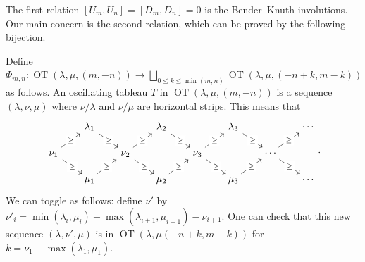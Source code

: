 \documentclass[12pt,a4paper]{article}
\theoremstyle{plain}
\theoremstyle{definition}
\theoremstyle{remark}
\newcommand{\OT}{\operatorname{OT}}
\begin{document}
    The first relation $[U_m,U_n] = [D_m,D_n] = 0$ is the Bender--Knuth involutions. Our main concern is the second relation, which can be proved by the following bijection.

    Define $\Phi_{m,n}:\OT(\lambda,\mu, (m,-n)) \longrightarrow \bigsqcup_{0\leq k \leq \min(m,n)}\OT(\lambda,\mu, (-n+k, m-k))$ as follows. An oscillating tableau $T$ in $\OT(\lambda,\mu, (m,-n))$ is a sequence $(\lambda,\nu,\mu)$ where $\nu/\lambda$ and $\nu/\mu$ are horizontal strips. This means that
    \[\begin{tikzcd}[sep = scriptsize]
    	& {\lambda_1} && {\lambda_2} && {\lambda_3} && \cdots \\
    	{\nu_1} && {\nu_2} && {\nu_3} && \cdots \\
    	& {\mu_1} && {\mu_2} && {\mu_3} && \cdots
    	\arrow["\geq"{description}, from=1-2, to=2-3]
        \arrow["\geq"{description}, from=1-4, to=2-5]
        \arrow["\geq"{description}, from=1-6, to=2-7]
        \arrow["\geq"{description}, from=2-1, to=1-2]
        \arrow["\geq"{description}, from=2-1, to=3-2]
        \arrow["\geq"{description}, from=2-3, to=1-4]
        \arrow["\geq"{description}, from=2-3, to=3-4]
        \arrow["\geq"{description}, from=2-5, to=1-6]
        \arrow["\geq"{description}, from=2-5, to=3-6]
        \arrow["\geq"{description}, from=2-7, to=1-8]
        \arrow["\geq"{description}, from=2-7, to=3-8]
        \arrow["\geq"{description}, from=3-2, to=2-3]
        \arrow["\geq"{description}, from=3-4, to=2-5]
        \arrow["\geq"{description}, from=3-6, to=2-7]
    \end{tikzcd}.\]
    We can toggle as follows: define $\nu'$ by $\nu'_i = \min(\lambda_i,\mu_i) + \max(\lambda_{i+1},\mu_{i+1}) - \nu_{i+1}$. One can check that this new sequence $(\lambda,\nu',\mu)$ is in $\OT(\lambda,\mu (-n+k, m-k))$ for $k = \nu_1 - \max(\lambda_1,\mu_1)$.
\end{document}

